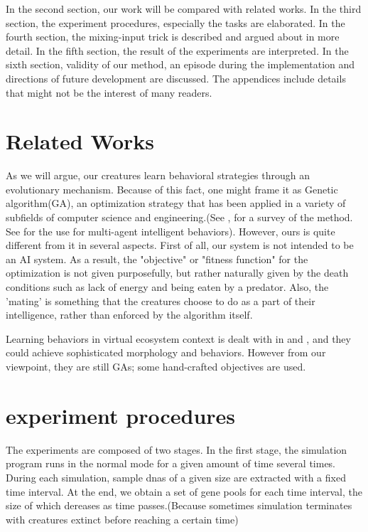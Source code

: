 \documentclass{amsart}
\theoremstyle{definition}
\theoremstyle{remark}
\numberwithin{equation}{section}
\begin{document}
	In the second section, our work will be compared with related works. In the third section, the experiment procedures, especially the tasks are elaborated. In the fourth section, the mixing-input trick is described and argued about in more detail. In the fifth section, the result of the experiments are interpreted. In the sixth section, validity of our method, an episode during the implementation and directions of future development are discussed. The appendices include details that might not be the interest of many readers. 

\section{Related Works}
	As we will argue, our creatures learn behavioral strategies through an evolutionary mechanism. Because of this fact, one might frame it as Genetic algorithm(GA), an optimization strategy that has been applied in a variety of subfields of computer science and engineering.(See \cite{ga_survey}, for a survey of the method. See \cite{lee} for the use for multi-agent intelligent behaviors). However, ours is quite different from it in several aspects. First of all, our system is not intended to be an AI system. As a result, the "objective" or "fitness function" for the optimization is not given purposefully, but rather naturally given by the death conditions such as lack of energy and being eaten by a predator. Also, the 'mating' is something that the creatures choose to do as a part of their intelligence, rather than enforced by the algorithm itself. 
	
	Learning behaviors in virtual ecosystem context is dealt with in \cite{sims} and \cite{jeremy}, and they could achieve sophisticated morphology and behaviors. However from our viewpoint, they are still GAs; some hand-crafted objectives are used.  

	
	
\section{experiment procedures}

The experiments are composed of two stages. In the first stage, the simulation program runs in the normal mode for a given amount of time several times. During each simulation, sample dnas of a given size are extracted with a fixed time interval. At the end, we obtain a set of gene pools for each time interval, the size of which dereases as time passes.(Because sometimes simulation terminates with creatures extinct before reaching a certain time) 
\end{document}
